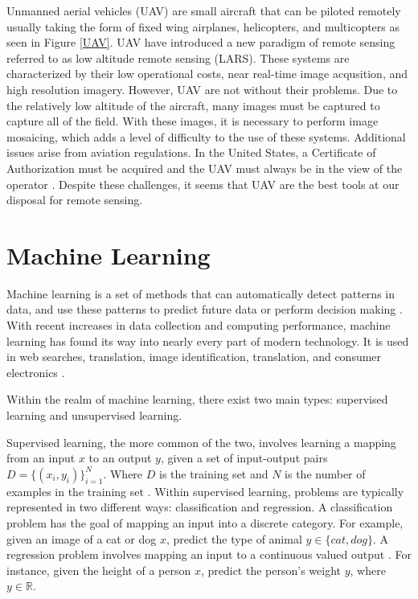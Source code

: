 Unmanned aerial vehicles (UAV) are small aircraft that can be piloted remotely usually taking the form of fixed wing airplanes, helicopters, and multicopters as seen in Figure \ref{UAV}. UAV have introduced a new paradigm of remote sensing referred to as low altitude remote sensing (LARS). These systems are characterized by their low operational costs, near real-time image acqusition, and high resolution imagery. However, UAV are not without their problems. Due to the relatively low altitude of the aircraft, many images must be captured to capture all of the field. With these images, it is necessary to perform image mosaicing, which adds a level of difficulty to the use of these systems. Additional issues arise from aviation regulations. In the United States, a Certificate of Authorization must be acquired and the UAV must always be in the view of the operator \cite{Zhang2012}. Despite these challenges, it seems that UAV are the best tools at our disposal for remote sensing.


\section{Machine Learning}
Machine learning is a set of methods that can automatically detect patterns in data, and use these patterns to predict future data or perform decision making \cite{Murphy}. With recent increases in data collection and computing performance, machine learning has found its way into nearly every part of modern technology. It is used in web searches, translation, image identification, translation, and consumer electronics \cite{Nature_DL}.

Within the realm of machine learning, there exist two main types: supervised learning and unsupervised learning. 

Supervised learning, the more common of the two, involves learning a mapping from an input $x$ to an output $y$, given a set of input-output pairs $D = \{(x_i, y_i)\}^N_{i=1}$. Where $D$ is the training set and $N$ is the number of examples in the training set \cite{Murphy}. Within supervised learning, problems are typically represented in two different ways: classification and regression. A classification problem has the goal of mapping an input into a discrete category. For example, given an image of a cat or dog $x$, predict the type of animal $y \in \{cat, dog\}$. A regression problem involves mapping an input to a continuous valued output \cite{Murphy}. For instance, given the height of a person $x$, predict the person's weight $y$, where $y \in \mathbb{R}$.

